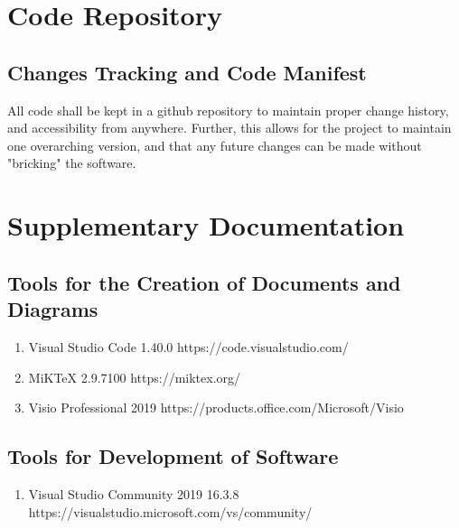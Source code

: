 \documentclass[12pt, letterpaper]{article}
\begin{document}
\section{Code Repository}
\subsection{Changes Tracking and Code Manifest}
All code shall be kept in a github repository to maintain proper change history, and accessibility from anywhere.\cite{MAFI} Further, this allows 
for the project to maintain one overarching version, and that any future changes can be made without "bricking" the software. 
\section{Supplementary Documentation}
\subsection{Tools for the Creation of Documents and Diagrams}
\begin{enumerate}
    \item Visual Studio Code 1.40.0 https://code.visualstudio.com/
    \item MiKTeX 2.9.7100 https://miktex.org/
    \item Visio Professional 2019 https://products.office.com/Microsoft/Visio
\end{enumerate}
\subsection{Tools for Development of Software}
\begin{enumerate}
    \item Visual Studio Community 2019 16.3.8 https://visualstudio.microsoft.com/vs/community/
\end{enumerate}
\end{document}
